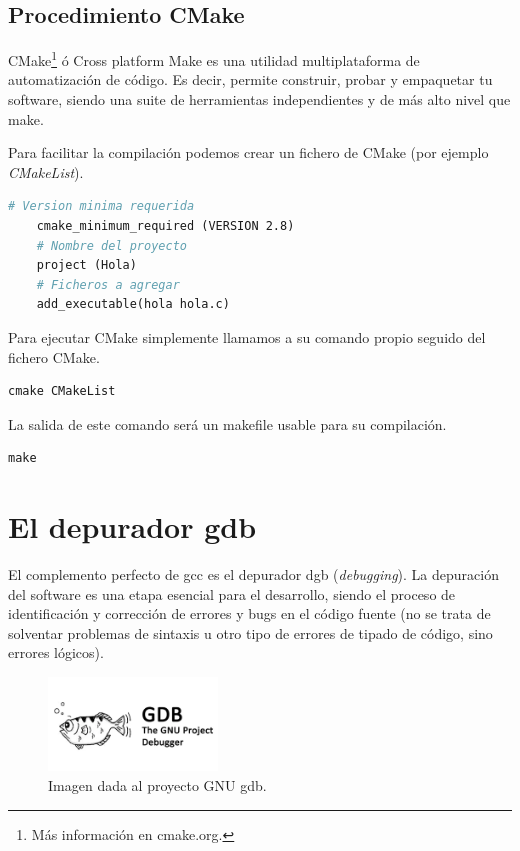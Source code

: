 \documentclass[a4paper, 11pt, titlepage]{article}
\begin{document}
    \subsection{Procedimiento CMake}

        CMake\footnote{
            Más información en cmake.org.
        } ó Cross platform Make es una utilidad multiplataforma de automatización de código.
        Es decir, permite construir, probar y empaquetar tu software, siendo una suite de herramientas 
        independientes y de más alto nivel que make.

        Para facilitar la compilación podemos crear un fichero de CMake (por ejemplo \textit{CMakeList}).

        \begin{lstlisting}[language=make]
    # Version minima requerida
    cmake_minimum_required (VERSION 2.8)
    # Nombre del proyecto
    project (Hola)
    # Ficheros a agregar
    add_executable(hola hola.c)\end{lstlisting}
    
        Para ejecutar CMake simplemente llamamos a su comando propio seguido del fichero CMake.

        \begin{lstlisting}[language=make]
    cmake CMakeList\end{lstlisting}

        La salida de este comando será un makefile usable para su compilación.

        \begin{lstlisting}[language=make]
    make\end{lstlisting}

\section{El depurador gdb}

    El complemento perfecto de gcc es el depurador dgb (\textit{debugging}). La depuración 
    del software es una etapa esencial para el desarrollo, siendo el proceso de identificación 
    y corrección de errores y bugs en el código fuente (no se trata de solventar problemas 
    de sintaxis u otro tipo de errores de tipado de código, sino errores lógicos).

    \begin{figure}[htp]
        \centering
        \includegraphics[width=0.4\textwidth]{resources/gnu-gdb.png}
        \caption{Imagen dada al proyecto GNU gdb.}
        \label{gdblogo}
    \end{figure}
\end{document}

